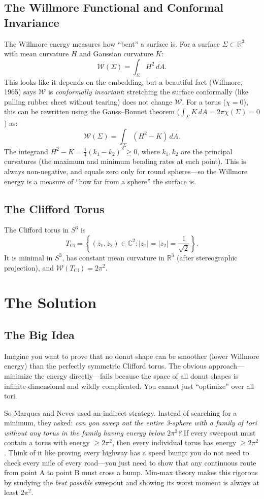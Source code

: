 \subsection{The Willmore Functional and Conformal Invariance}
The Willmore energy measures how ``bent'' a surface is. For a surface $\Sigma \subset \mathbb{R}^3$ with mean curvature $H$ and Gaussian curvature $K$:
\[
\mathcal{W}(\Sigma) = \int_\Sigma H^2 \, dA.
\]
This looks like it depends on the embedding, but a beautiful fact (Willmore, 1965) says $\mathcal{W}$ is \emph{conformally invariant}: stretching the surface conformally (like pulling rubber sheet without tearing) does not change $\mathcal{W}$. For a torus ($\chi=0$), this can be rewritten using the Gauss--Bonnet theorem ($\int_\Sigma K \, dA = 2\pi\chi(\Sigma) = 0$) as:
\[
\mathcal{W}(\Sigma) = \int_\Sigma (H^2 - K) \, dA.
\]
The integrand $H^2 - K = \frac{1}{4}(k_1 - k_2)^2 \ge 0$, where $k_1, k_2$ are the principal curvatures (the maximum and minimum bending rates at each point). This is always non-negative, and equals zero only for round spheres---so the Willmore energy is a measure of ``how far from a sphere'' the surface is.

\subsection{The Clifford Torus}
The Clifford torus in $S^3$ is
\[
T_{\text{Cl}} = \left\{ (z_1, z_2) \in \mathbb{C}^2 : |z_1| = |z_2| = \frac{1}{\sqrt{2}} \right\}.
\]
It is minimal in $S^3$, has constant mean curvature in $\mathbb{R}^3$ (after stereographic projection), and $\mathcal{W}(T_{\text{Cl}}) = 2\pi^2$.

\section{The Solution}

\subsection{The Big Idea}

Imagine you want to prove that no donut shape can be smoother (lower Willmore energy) than the perfectly symmetric Clifford torus. The obvious approach---minimize the energy directly---fails because the space of all donut shapes is infinite-dimensional and wildly complicated. You cannot just ``optimize'' over all tori.

So Marques and Neves used an indirect strategy. Instead of searching for a minimum, they asked: \emph{can you sweep out the entire 3-sphere with a family of tori without any torus in the family having energy below $2\pi^2$?} If every sweepout must contain a torus with energy $\ge 2\pi^2$, then every individual torus has energy $\ge 2\pi^2$. Think of it like proving every highway has a speed bump: you do not need to check every mile of every road---you just need to show that any continuous route from point A to point B must cross a bump. Min-max theory makes this rigorous by studying the \emph{best possible} sweepout and showing its worst moment is always at least $2\pi^2$.

